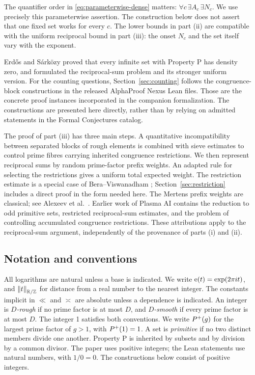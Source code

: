 The quantifier order in \eqref{eq:parameterwise-dense} matters:
\(\forall c\,\exists A_c\,\exists N_c\). We use precisely this
parameterwise assertion. The construction below does not assert that one
fixed set works for every \(c\). The lower bounds in part (ii) are
compatible with the uniform reciprocal bound in part (iii): the onset
\(N_c\) and the set itself vary with the exponent.

Erd\H{o}s and S\'ark\"ozy \cite{ES} proved that every infinite set with
Property P has density zero, and formulated the reciprocal-sum problem
and its stronger uniform version. For the counting questions,
Section~\ref{sec:counting} follows the congruence-block constructions in
the released AlphaProof Nexus Lean files. Those are the concrete proof
instances incorporated in the companion formalization. The constructions
are presented here directly, rather than by relying on admitted statements
in the Formal Conjectures catalog.

The proof of part (iii) has three main steps. A quantitative
incompatibility between separated blocks of rough elements is combined
with sieve estimates to control prime fibres carrying inherited congruence
restrictions. We then represent reciprocal sums by random prime-factor
prefix weights. An adapted rule for selecting the restrictions gives a
uniform total expected weight. The restriction estimate is a special case
of Bera--Viswanadham \cite{BV}; Section~\ref{sec:restriction} includes a
direct proof in the form needed here. The Mertens prefix weights are
classical; see Alexeev et al.\ \cite{AB}. Earlier work of Plasma AI
\cite{Plasma} contains the reduction to odd primitive sets, restricted
reciprocal-sum estimates, and the problem of controlling accumulated
congruence restrictions. These attributions apply to the reciprocal-sum
argument, independently of the provenance of parts (i) and (ii).

\subsection*{Notation and conventions}
All logarithms are natural unless a base is indicated.
We write \(\mathrm e(t)=\exp(2\pi i t)\), and \(\left\lVert t\right\rVert_{\mathbb R/\mathbb Z}\) for distance
from a real number to the nearest integer. The constants implicit in
\(\ll\) and \(\asymp\) are absolute unless a dependence is indicated.
An integer is \emph{\(D\)-rough} if no prime factor is at most \(D\),
and \emph{\(D\)-smooth} if every prime factor is at most \(D\).
The integer 1 satisfies both conventions. We write \(P^{+}(g)\) for
the largest prime factor of \(g>1\), with \(P^{+}(1)=1\).
A set is \emph{primitive} if no two distinct members divide one another.
Property P is inherited by subsets and by division by a common divisor.
The paper uses positive integers; the Lean statements use natural numbers,
with \(1/0=0\). The constructions below consist of positive integers.

